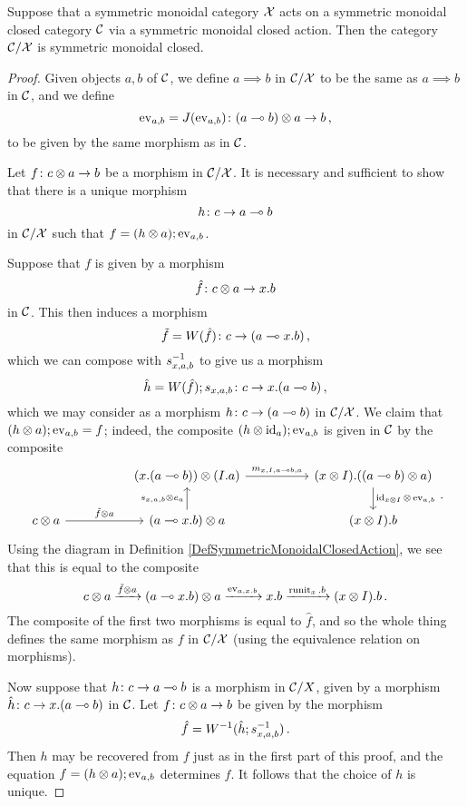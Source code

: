 \documentclass{article}
\begin{document}
\begin{proposition}
  Suppose that a symmetric monoidal category $\mathcal X$ acts on a symmetric monoidal closed category ${\mathcal{C}}$ via a symmetric monoidal closed action.  
  Then the category ${\mathcal{C}}/\mathcal X$ is symmetric monoidal closed.
\end{proposition}
\begin{proof}
  Given objects $a,b$ of ${\mathcal{C}}$, we define $a\implies b$ in ${\mathcal{C}}/\mathcal X$ to be the same as $a\implies b$ in ${\mathcal{C}}$, and we define
  \[
    \operatorname{ev}_{a,b} = J(\operatorname{ev}_{a,b}) \colon (a\multimap b)\otimes a \to b\,,
    \]
  to be given by the same morphism as in ${\mathcal{C}}$.

  Let $f \colon c \otimes a \to b$ be a morphism in ${\mathcal{C}}/\mathcal X$.  
  It is necessary and sufficient to show that there is a unique morphism
  \[
    h \colon c \to a \multimap b
    \]
  in ${\mathcal{C}}/\mathcal X$ such that $f = (h\otimes a);\operatorname{ev}_{a,b}$.

  Suppose that $f$ is given by a morphism
  \[
    \hat{f} \colon c \otimes a \to x.b
    \]
  in ${\mathcal{C}}$.  
  This then induces a morphism
  \[
    \tilde{f} = W(\hat{f}) \colon c \to (a \multimap x.b)\,,
    \]
  which we can compose with $s_{x,a,b}^{-1}$ to give us a morphism
  \[
    \hat{h} = W(\hat{f});s_{x,a,b} \colon c \to x.(a\multimap b)\,,
    \]
  which we may consider as a morphism $h\colon c \to (a\multimap b)$ in ${\mathcal{C}}/\mathcal X$.  
  We claim that $(h\otimes a);\operatorname{ev}_{a,b}=f$; indeed, the composite $(h\otimes \operatorname{id}_a);\operatorname{ev}_{a,b}$ is given in ${\mathcal{C}}$ by the composite
  \[
    \begin{tikzcd}[column sep=50pt]
        & (x.(a\implies b)) \tensor (I.a) \arrow[r, "{m_{x,I,a\implies b,a}}"]
          & (x \tensor I).((a\implies b)\tensor a) \arrow[d, "{\id_{x\tensor I}\tensor \ev_{a,b}}"] \\
      c \tensor a \arrow[r, "\tilde{f}\tensor a"]
        & (a \implies x.b)\tensor a \arrow[u, "{s_{x,a,b}\tensor e_a}"]
          & (x\tensor I).b
    \end{tikzcd}\,.
    \]
  Using the diagram in Definition \ref{DefSymmetricMonoidalClosedAction}, we see that this is equal to the composite
  \[
    c\otimes a \xrightarrow{\tilde{f}\otimes a}
    (a \multimap x.b) \otimes a \xrightarrow{\operatorname{ev}_{a,x.b}}
    x.b \xrightarrow{\operatorname{runit}_x.b}
    (x\otimes I).b\,.
    \]
  The composite of the first two morphisms is equal to $\hat{f}$, and so the whole thing defines the same morphism as $f$ in ${\mathcal{C}}/\mathcal X$ (using the equivalence relation on morphisms).

  Now suppose that $h\colon c \to a\multimap b$ is a morphism in ${\mathcal{C}}/X$, given by a morphism $\hat{h} \colon c \to x.(a\multimap b)$ in ${\mathcal{C}}$.
  Let $f \colon c \otimes a \to b$ be given by the morphism
  \[
    \hat{f} = W^{-1}(\hat{h};s_{x,a,b}^{-1})\,.
    \]
  Then $h$ may be recovered from $f$ just as in the first part of this proof, and the equation $f = (h\otimes a);\operatorname{ev}_{a,b}$ determines $f$.  
  It follows that the choice of $h$ is unique.
\end{proof}
\end{document}
